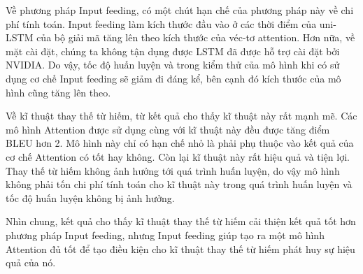 Về phương pháp Input feeding, có một chút hạn chế của phương pháp này về chi phí tính toán. Input feeding làm kích thước đầu vào ở các thời điểm của uni-LSTM của bộ giải mã tăng lên theo kích thước của véc-tơ attention. Hơn nữa, về mặt cài đặt, chúng ta không tận dụng được LSTM đã được hỗ trợ cài đặt bởi NVIDIA. Do vậy, tốc độ huấn luyện và trong kiểm thử của mô hình khi có sử dụng cơ chế Input feeding sẽ giảm đi đáng kể, bên cạnh đó kích thước của mô hình cũng tăng lên theo.

Về kĩ thuật thay thế từ hiếm, từ kết quả cho thấy kĩ thuật này rất mạnh mẽ. Các mô hình Attention được sử dụng cùng với kĩ thuật này đều được tăng điểm BLEU hơn 2. Mô hình này chỉ có hạn chế nhỏ là phải phụ thuộc vào kết quả của cơ chế Attention có tốt hay không. Còn lại kĩ thuật này rất hiệu quả và tiện lợi. Thay thế từ hiếm không ảnh hưởng tới quá trình huấn luyện, do vậy mô hình không phải tốn chi phí tính toán cho kĩ thuật này trong quá trình huấn luyện và tốc độ huấn luyện không bị ảnh hưởng. 

Nhìn chung, kết quả cho thấy kĩ thuật thay thế từ hiếm cải thiện kết quả tốt hơn phương pháp Input feeding, nhưng Input feeding giúp tạo ra một mô hình Attention đủ tốt để tạo điều kiện cho kĩ thuật thay thế từ hiếm phát huy sự hiệu quả của nó.

